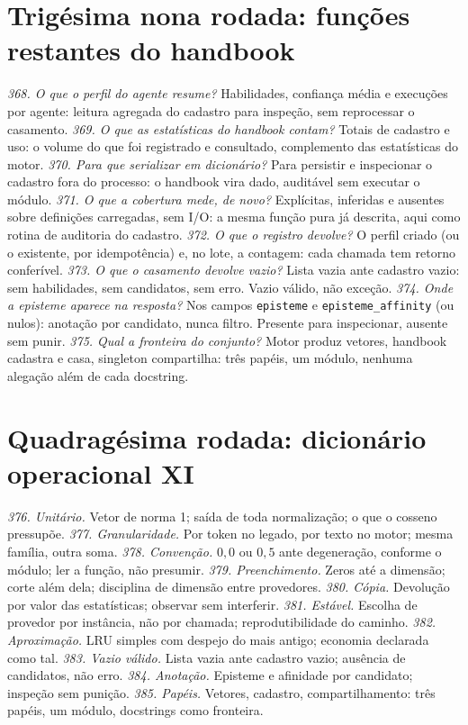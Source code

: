 \section{Trigésima nona rodada: funções restantes do handbook}
\textit{368. O que o perfil do agente resume?} Habilidades, confiança média e execuções por agente: leitura agregada do cadastro para inspeção, sem reprocessar o casamento.
\textit{369. O que as estatísticas do handbook contam?} Totais de cadastro e uso: o volume do que foi registrado e consultado, complemento das estatísticas do motor.
\textit{370. Para que serializar em dicionário?} Para persistir e inspecionar o cadastro fora do processo: o handbook vira dado, auditável sem executar o módulo.
\textit{371. O que a cobertura mede, de novo?} Explícitas, inferidas e ausentes sobre definições carregadas, sem I/O: a mesma função pura já descrita, aqui como rotina de auditoria do cadastro.
\textit{372. O que o registro devolve?} O perfil criado (ou o existente, por idempotência) e, no lote, a contagem: cada chamada tem retorno conferível.
\textit{373. O que o casamento devolve vazio?} Lista vazia ante cadastro vazio: sem habilidades, sem candidatos, sem erro. Vazio válido, não exceção.
\textit{374. Onde a episteme aparece na resposta?} Nos campos \texttt{episteme} e \texttt{episteme\_affinity} (ou nulos): anotação por candidato, nunca filtro. Presente para inspecionar, ausente sem punir.
\textit{375. Qual a fronteira do conjunto?} Motor produz vetores, handbook cadastra e casa, singleton compartilha: três papéis, um módulo, nenhuma alegação além de cada docstring.
\section{Quadragésima rodada: dicionário operacional XI}
\textit{376. Unitário.} Vetor de norma 1; saída de toda normalização; o que o cosseno pressupõe.
\textit{377. Granularidade.} Por token no legado, por texto no motor; mesma família, outra soma.
\textit{378. Convenção.} $0{,}0$ ou $0{,}5$ ante degeneração, conforme o módulo; ler a função, não presumir.
\textit{379. Preenchimento.} Zeros até a dimensão; corte além dela; disciplina de dimensão entre provedores.
\textit{380. Cópia.} Devolução por valor das estatísticas; observar sem interferir.
\textit{381. Estável.} Escolha de provedor por instância, não por chamada; reprodutibilidade do caminho.
\textit{382. Aproximação.} LRU simples com despejo do mais antigo; economia declarada como tal.
\textit{383. Vazio válido.} Lista vazia ante cadastro vazio; ausência de candidatos, não erro.
\textit{384. Anotação.} Episteme e afinidade por candidato; inspeção sem punição.
\textit{385. Papéis.} Vetores, cadastro, compartilhamento: três papéis, um módulo, docstrings como fronteira.
